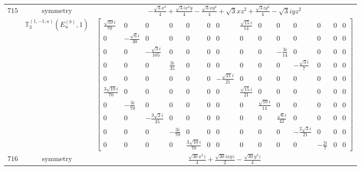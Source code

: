 \documentclass[fleqn,8pt,landscape]{jsarticle}
\begin{document}
\begin{longtable}{ccc}
$ 715 $ & $ \text{symmetry} $ & $ - \frac{\sqrt{3} x^{3}}{4} + \frac{\sqrt{3} i x^{2} y}{4} - \frac{\sqrt{3} x y^{2}}{4} + \sqrt{3} x z^{2} + \frac{\sqrt{3} i y^{3}}{4} - \sqrt{3} i y z^{2} $ \\
$  $ & $ \mathbb{T}_{3}^{(1,-1;a)}(E_{u}^{(b)},1) $ & $ \begin{bmatrix} \frac{\sqrt{10} i}{70} & 0 & 0 & 0 & 0 & 0 & 0 & \frac{\sqrt{15} i}{14} & 0 & 0 & 0 & 0 & 0 & 0 \\ 0 & - \frac{\sqrt{6} i}{30} & 0 & 0 & 0 & 0 & 0 & 0 & 0 & 0 & 0 & 0 & 0 & 0 \\ 0 & 0 & - \frac{\sqrt{3} i}{105} & 0 & 0 & 0 & 0 & 0 & 0 & - \frac{3 i}{14} & 0 & 0 & 0 & 0 \\ 0 & 0 & 0 & \frac{3 i}{35} & 0 & 0 & 0 & 0 & 0 & 0 & - \frac{\sqrt{3} i}{7} & 0 & 0 & 0 \\ 0 & 0 & 0 & 0 & 0 & 0 & - \frac{\sqrt{21} i}{21} & 0 & 0 & 0 & 0 & 0 & 0 & 0 \\ \frac{3 \sqrt{10} i}{70} & 0 & 0 & 0 & 0 & 0 & 0 & \frac{\sqrt{15} i}{21} & 0 & 0 & 0 & 0 & 0 & 0 \\ 0 & - \frac{3 i}{70} & 0 & 0 & 0 & 0 & 0 & 0 & \frac{\sqrt{10} i}{14} & 0 & 0 & 0 & 0 & 0 \\ 0 & 0 & - \frac{3 \sqrt{2} i}{35} & 0 & 0 & 0 & 0 & 0 & 0 & \frac{\sqrt{6} i}{42} & 0 & 0 & 0 & 0 \\ 0 & 0 & 0 & - \frac{3 i}{70} & 0 & 0 & 0 & 0 & 0 & 0 & - \frac{2 \sqrt{3} i}{21} & 0 & 0 & 0 \\ 0 & 0 & 0 & 0 & \frac{3 \sqrt{10} i}{70} & 0 & 0 & 0 & 0 & 0 & 0 & - \frac{2 i}{7} & 0 & 0 \end{bmatrix} $ \\ \hline
$ 716 $ & $ \text{symmetry} $ & $ \frac{\sqrt{30} x^{2} z}{4} + \frac{\sqrt{30} i x y z}{2} - \frac{\sqrt{30} y^{2} z}{4} $ \\

\end{longtable}
\end{document}

